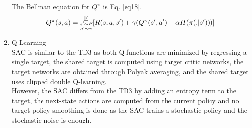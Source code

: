 \begin{enumerate}[label={\alph*)}]
\begin{equation}
        \label{eq17}
    \end{equation}
    The Bellman equation for $Q^\pi$ is Eq. \ref{eq18}.
    \begin{equation}
        Q^\pi(s, a) = \substack{\mathlarger{\text{E}} \\ s' \thicksim P\\ a' \thicksim \pi}[R(s, a, s') + \gamma (Q^\pi(s', a') + \alpha H (\pi(.|s')))]
        \label{eq18}
    \end{equation}
    \item Q-Learning\\
    SAC is similar to the TD3 as both Q-functions are minimized by regressing a single target, the shared target is computed using target critic networks, the target networks are obtained through Polyak averaging, and the shared target uses clipped double Q-learning.\\
    
    However, the SAC differs from the TD3 by adding an entropy term to the target, the next-state actions are computed from the current policy and no target policy smoothing is done as the SAC trains a stochastic policy and the stochastic noise is enough.\\


\end{enumerate}
